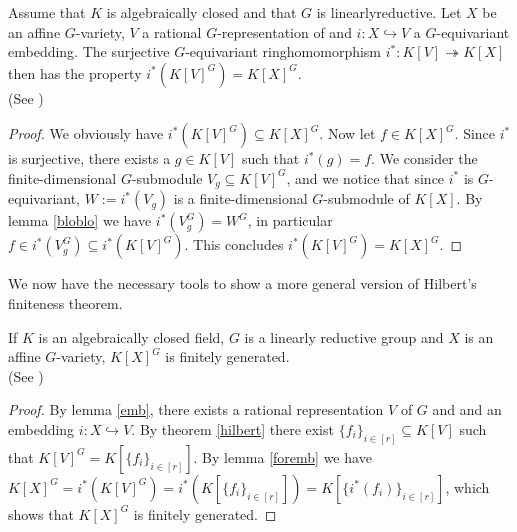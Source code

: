 \begin{lemma}\label{foremb}
  Assume that $K$ is algebraically closed and that $G$ is linearly\linebreak reductive.
  Let $X$ be an affine $G$-variety, $V$ a rational $G$-representation of and $i \colon X \hookrightarrow V$ a $G$-equivariant embedding.
  The surjective $G$-equivariant ring\linebreak homomorphism $i^\ast \colon K[V] \twoheadrightarrow K[X]$ then has the property $i^\ast (K[V]^G) = K[X]^G$. \\
  (See \cite[2.2.9]{DK15})
\end{lemma}

\begin{proof}
  We obviously have $i^\ast(K[V]^G) \subseteq K[X]^G$.
  Now let $f \in K[X]^G$.
  Since $i^\ast$ is surjective, there exists a $g \in K[V]$ such that $i^\ast (g) = f$.
  We consider the finite-dimensional $G$-submodule $V_g \subseteq K[V]^G$, and we notice that since $i^\ast$ is $G$-equivariant, $W := i^\ast (V_g)$ is a finite-dimensional $G$-submodule of $K[X]$.  %
  By lemma \ref{bloblo} we have $i^\ast (V_g^G) = W^G$, in particular $f \in i^\ast (V_g^G) \subseteq i^\ast(K[V]^G)$. %
  This concludes $i^\ast(K[V]^G) = K[X]^G$.
\end{proof}

We now have the necessary tools to show a more general version of Hilbert's finiteness theorem.

\begin{theorem}\label{hil2}
  If $K$ is an algebraically closed field, $G$ is a linearly reductive group and $X$ is an affine $G$-variety, $K[X]^G$ is finitely generated.  \\
  (See \cite[2.2.11]{DK15})
\end{theorem}

\begin{proof}
  By lemma \ref{emb}, there exists a rational representation $V$ of $G$ and and an embedding $i \colon X \hookrightarrow V$.
  By theorem \ref{hilbert} there exist $ \{f_i\}_{i \in [r]} \subseteq K[V]$ such that $K[V]^G = K[\{f_i\}_{i \in [r]}]$.
  By lemma \ref{foremb} we have $K[X]^G = i^\ast (K[V]^G) = i^\ast (K[\{f_i\}_{i \in [r]}]) = K[\{i^\ast(f_i)\}_{i \in [r]}]$, which shows that $K[X]^G$ is finitely generated.
\end{proof}

